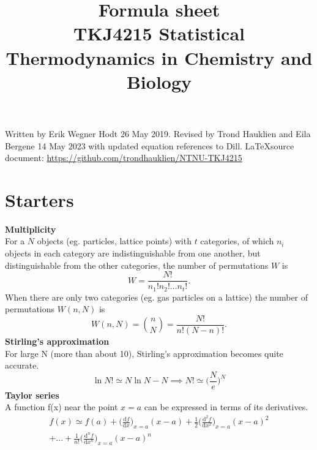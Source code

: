 \documentclass[8pt]{article}
\numberwithin{equation}{section}
\begin{document}
\author{}
\title{%
Formula sheet\\
\large TKJ4215 Statistical Thermodynamics in Chemistry and Biology}

\maketitle


\begin{multicols}{2}
\noindent Written by Erik Wegner Hodt 26 May 2019. Revised by Trond Hauklien and Eila Bergene 14 May 2023 with updated equation references to Dill. \LaTeX source document: \url{https://github.com/trondhauklien/NTNU-TKJ4215}

\section{Starters}
\textbf{Multiplicity}\\
For a $N$ objects (eg. particles, lattice points) with $t$ categories, of which $n_i$ objects in each category are indistinguishable from one another, but distinguishable from the other categories, the number of permutations $W$ is
\begin{equation} \tag{1.21}
W=\frac{N!}{n_1!n_2!\dots n_t!}.
\end{equation}
When there are only two categories (eg. gas particles on a lattice) the number of permutations $W(n,N)$ is
\begin{equation} \tag{1.22}
W(n,N)=\binom{n}{N}=\frac{N!}{n!(N-n)!}.
\end{equation}
\textbf{Stirling's approximation}\\
For large N (more than about 10), Stirling's approximation becomes quite accurate. 
\begin{equation} \tag{B.3}
\ln{N!}\simeq N\ln{N}-N \implies N!\simeq \bigg(\frac{N}{e} \bigg)^{N}
\end{equation}
\textbf{Taylor series}\\
A function f(x) near the point $x=a$ can be expressed in terms of its derivatives. 
\begin{equation}\tag{A.1}
\begin{split} 
f(x)\simeq f(a)+\bigg(\frac{\mathrm{d}f}{\mathrm{d}x}\bigg)_{x=a}(x-a)+\frac{1}{2}\bigg(\frac{\mathrm{d}^{2}f}{\mathrm{d}x^{2}}\bigg)_{x=a}(x-a)^2\\+...+\frac{1}{n!}\bigg(\frac{\mathrm{d}^{n}f}{\mathrm{d}x^{n}}\bigg)_{x=a}(x-a)^{n}
\end{split}
\end{equation}

\end{multicols}
\end{document}
